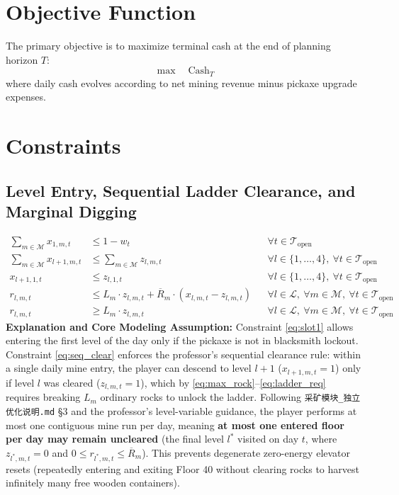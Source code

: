 \documentclass[11pt,a4paper]{article}
\begin{document}
\section{Objective Function}
The primary objective is to maximize terminal cash at the end of planning horizon $T$:
\begin{equation}
    \max \quad \text{Cash}_T
\end{equation}
where daily cash evolves according to net mining revenue minus pickaxe upgrade expenses.

\section{Constraints}

\subsection{Level Entry, Sequential Ladder Clearance, and Marginal Digging}
\begin{align}
    \sum_{m \in \mathcal{M}} x_{1,m,t} &\le 1 - w_t && \forall t \in \mathcal{T}_{\text{open}} \label{eq:slot1} \\
    \sum_{m \in \mathcal{M}} x_{l+1,m,t} &\le \sum_{m \in \mathcal{M}} z_{l,m,t} && \forall l \in \{1,\dots,4\},\ \forall t \in \mathcal{T}_{\text{open}} \label{eq:seq_clear} \\
    x_{l+1,1,t} &\le z_{l,1,t} && \forall l \in \{1,\dots,4\},\ \forall t \in \mathcal{T}_{\text{open}} \label{eq:no_regress} \\
    r_{l,m,t} &\le L_m \cdot z_{l,m,t} + \overline{R}_m \cdot (x_{l,m,t} - z_{l,m,t}) && \forall l \in \mathcal{L},\ \forall m \in \mathcal{M},\ \forall t \in \mathcal{T}_{\text{open}} \label{eq:max_rock} \\
    r_{l,m,t} &\ge L_m \cdot z_{l,m,t} && \forall l \in \mathcal{L},\ \forall m \in \mathcal{M},\ \forall t \in \mathcal{T}_{\text{open}} \label{eq:ladder_req}
\end{align}
\textbf{Explanation and Core Modeling Assumption:} Constraint \eqref{eq:slot1} allows entering the first level of the day only if the pickaxe is not in blacksmith lockout. Constraint \eqref{eq:seq_clear} enforces the professor's sequential clearance rule: within a single daily mine entry, the player can descend to level $l+1$ ($x_{l+1,m,t}=1$) only if level $l$ was cleared ($z_{l,m,t}=1$), which by \eqref{eq:max_rock}--\eqref{eq:ladder_req} requires breaking $L_m$ ordinary rocks to unlock the ladder. Following \texttt{采矿模块\_独立优化说明.md} \S3 and the professor's level-variable guidance, the player performs at most one contiguous mine run per day, meaning \textbf{at most one entered floor per day may remain uncleared} (the final level $l^*$ visited on day $t$, where $z_{l^*,m,t} = 0$ and $0 \le r_{l^*,m,t} \le \overline{R}_m$). This prevents degenerate zero-energy elevator resets (repeatedly entering and exiting Floor 40 without clearing rocks to harvest infinitely many free wooden containers).
\end{document}
